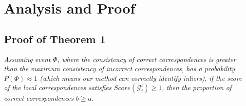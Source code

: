 \clearpage
\setcounter{page}{1}
\maketitlesupplementary


\section{Analysis and Proof}

\subsection{Proof of Theorem 1}
\emph{
        Assuming event $\Phi $, where the consistency of correct correspondences is greater than the maximum consistency of incorrect correspondences, 
        has a probability ${P}(\Phi)\approx  1 $ (which means our method can correctly identify inliers),
        if the score of the local correspondences satisfies $Score(\mathcal{G}^{t}_i)\geqslant  1$, then the proportion of correct correspondences $b \geqslant a$.
}


